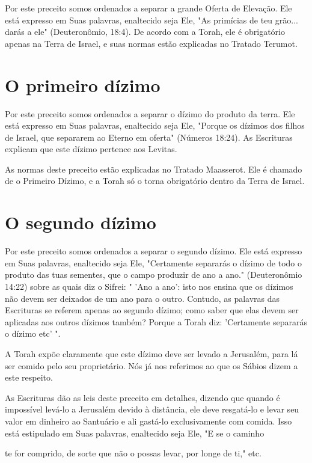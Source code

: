 \begin{itemize}
\begin{enumrate}
\begin{itemize}
\begin{itemize}
\begin{itemize}
Por este preceito somos ordenados a separar a grande Oferta de
Ele­vação. Ele está expresso em Suas palavras, enaltecido seja Ele, "As
primícias de teu grão... darás a ele" (Deuteronômio, 18:4). De acordo
com a Torah, ele é obrigatório apenas na Terra de Israel, e suas normas
estão explicadas no Tra­tado Terumot.

\section{O primeiro dízimo}

Por este preceito somos ordenados a separar o dízimo do produto da
terra. Ele está expresso em Suas palavras, enaltecido seja Ele, "Porque
os dízimos dos filhos de Israel, que separarem ao Eterno em oferta"
(Números 18:24). As Escrituras explicam que este dízimo pertence aos
Levitas.

As normas deste preceito estão explicadas no Tratado Maasserot. Ele é
chamado de o Primeiro Dízimo, e a Torah só o torna obrigatório dentro da
Terra de Israel.

\section{O segundo dízimo}

Por este preceito somos ordenados a separar o segundo dízimo. Ele está
expresso em Suas palavras, enaltecido seja Ele, "Certamente separarás o
dízimo de todo o produto das tuas sementes, que o campo produzir de ano
a ano." (Deuteronômio 14:22) sobre as quais diz o Sifrei: " 'Ano a ano':
isto nos ensina que os dízimos não devem ser deixados de um ano para o
outro. Contudo, as palavras das Escrituras se referem apenas ao segundo
dízimo; co­mo saber que elas devem ser aplicadas aos outros dízimos
também? Porque a Torah diz: 'Certamente separarás o dízimo etc' ".

A Torah expõe claramente que este dízimo deve ser levado a Jerusa­lém,
para lá ser comido pelo seu proprietário. Nós já nos referimos ao que os
Sábios dizem a este respeito.

As Escrituras dão as leis deste preceito em detalhes, dizendo que
quan­do é impossível levá-lo a Jerusalém devido à distância, ele deve
resgatá-lo e le­var seu valor em dinheiro ao Santuário e ali gastá-lo
exclusivamente com comi­da. Isso está estipulado em Suas palavras,
enaltecido seja Ele, "E se o caminho

te for comprido, de sorte que não o possas levar, por longe de ti," etc.


\end{itemize}
\end{itemize}
\end{itemize}
\end{enumrate}
\end{itemize}
